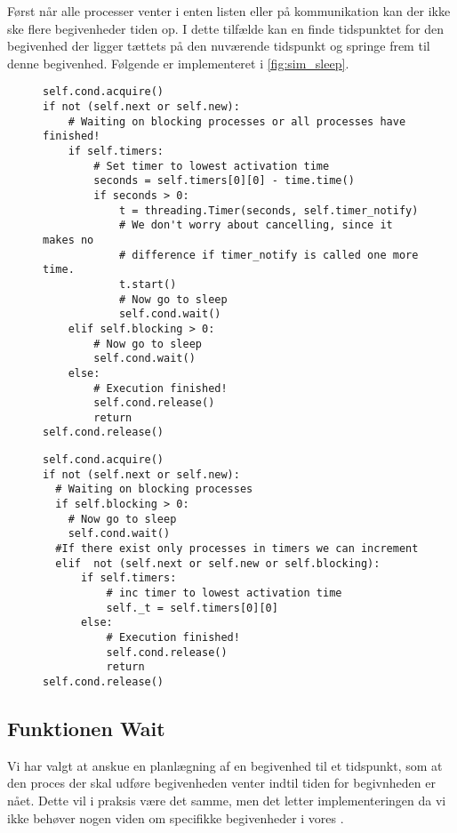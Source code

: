 Først når alle processer venter i enten  listen eller på kommunikation kan der ikke ske flere begivenheder tiden op. 
I dette tilfælde  kan \sched en finde tidspunktet for den begivenhed der ligger tættets på den nuværende tidspunkt  og springe frem til denne begivenhed. Følgende er implementeret i \cref{fig:sim_sleep}.
\begin{figure}[hbtp]
\begin{minipage}[c]{\linewidth}
\begin{lstlisting}[firstnumber=239, label=fig:blocking_sleep, caption=Uddrag af \sched en i \code{Scheduler}]
self.cond.acquire()
if not (self.next or self.new):
    # Waiting on blocking processes or all processes have finished!
    if self.timers:
        # Set timer to lowest activation time
        seconds = self.timers[0][0] - time.time()
        if seconds > 0:
            t = threading.Timer(seconds, self.timer_notify)
            # We don't worry about cancelling, since it makes no 
            # difference if timer_notify is called one more time.
            t.start()
            # Now go to sleep
            self.cond.wait()
    elif self.blocking > 0:
        # Now go to sleep
        self.cond.wait()
    else:
        # Execution finished!
        self.cond.release()
        return
self.cond.release()
\end{lstlisting}
\end{minipage}
\begin{minipage}[c]{\linewidth}
\begin{lstlisting}[firstnumber=158, label=fig:sim_sleep, caption= uddrag af \sched en i \code{Simulation}]
self.cond.acquire()
if not (self.next or self.new):
  # Waiting on blocking processes
  if self.blocking > 0:
    # Now go to sleep
    self.cond.wait()
  #If there exist only processes in timers we can increment
  elif  not (self.next or self.new or self.blocking): 
      if self.timers:
          # inc timer to lowest activation time
          self._t = self.timers[0][0]
      else:
          # Execution finished!
          self.cond.release()
          return
self.cond.release()  
\end{lstlisting}
\end{minipage}
\end{figure}


\subsection{Funktionen Wait}\label{sec:Wait}
Vi har valgt at anskue en planlægning af en begivenhed til et tidspunkt, som at den proces der skal udføre begivenheden venter indtil tiden for begivnheden er nået. Dette vil i praksis være det samme, men det letter implementeringen da vi ikke behøver nogen viden om specifikke begivenheder i vores \sched. 

